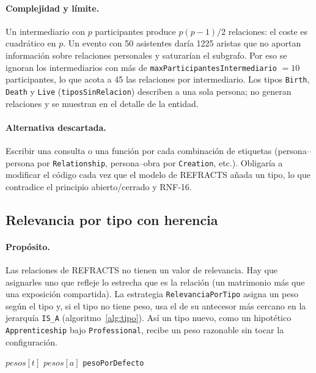 \paragraph{Complejidad y límite.} Un intermediario con $p$ participantes produce $p(p-1)/2$ relaciones: el coste es cuadrático en $p$. Un evento con 50 asistentes daría 1225 aristas que no aportan información sobre relaciones personales y saturarían el subgrafo. Por eso se ignoran los intermediarios con más de \texttt{maxParticipantesIntermediario} $=10$ participantes, lo que acota a 45 las relaciones por intermediario. Los tipos \texttt{Birth}, \texttt{Death} y \texttt{Live} (\texttt{tiposSinRelacion}) describen a una sola persona; no generan relaciones y se muestran en el detalle de la entidad.

\paragraph{Alternativa descartada.} Escribir una consulta o una función por cada combinación de etiquetas (persona–persona por \texttt{Relationship}, persona–obra por \texttt{Creation}, etc.). Obligaría a modificar el código cada vez que el modelo de REFRACTS añada un tipo, lo que contradice el principio abierto/cerrado y RNF-16.

\subsection{Relevancia por tipo con herencia}
\label{sec:alg-tipo}

\paragraph{Propósito.} Las relaciones de REFRACTS no tienen un valor de relevancia. Hay que asignarles uno que refleje lo estrecha que es la relación (un matrimonio más que una exposición compartida). La estrategia \texttt{RelevanciaPorTipo} asigna un peso según el tipo y, si el tipo no tiene peso, usa el de su antecesor más cercano en la jerarquía \texttt{IS\_A} (algoritmo~\ref{alg:tipo}). Así un tipo nuevo, como un hipotético \texttt{Apprenticeship} bajo \texttt{Professional}, recibe un peso razonable sin tocar la configuración.

\begin{algorithm}[htbp]
  \caption{Relevancia de un tipo (\texttt{RelevanciaPorTipo.calcular\_relevancia}).}
  \label{alg:tipo}
  \begin{algorithmic}[1]
       \State \Return $pesos[t]$ \EndIf
       
         \State \Return $pesos[a]$ \EndIf
      \EndFor
      \State \Return \texttt{pesoPorDefecto} 
    \EndFunction
  \end{algorithmic}
\end{algorithm}

